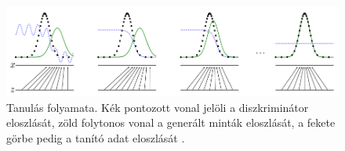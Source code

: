 


\begin{figure}[ht]
	\centering
	\includegraphics[width=1\columnwidth]{figures/gan_dist.png}
	\caption{Tanulás folyamata. Kék pontozott vonal jelöli a diszkriminátor eloszlását, zöld folytonos vonal a generált minták eloszlását, a fekete görbe pedig a tanító adat eloszlását \cite{fig:gan_dist}.}
	\label{fig:gan_dist}
\end{figure}

